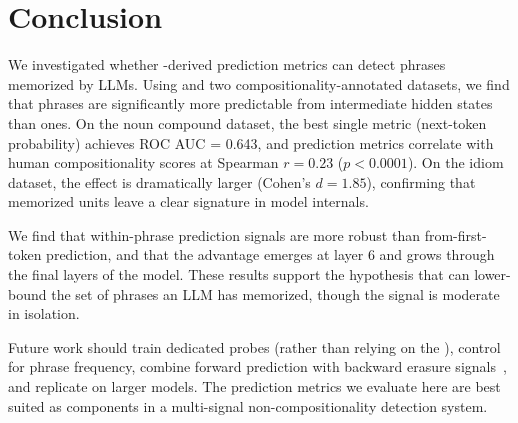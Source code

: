 \section{Conclusion}
\label{sec:conclusion}

We investigated whether \futurelens-derived prediction metrics can detect \noncomp phrases memorized by LLMs.
Using \gptxl and two compositionality-annotated datasets, we find that \noncomp phrases are significantly more predictable from intermediate hidden states than \comp ones.
On the \farahmand noun compound dataset, the best single metric (next-token probability) achieves ROC AUC = 0.643, and prediction metrics correlate with human compositionality scores at Spearman $r = 0.23$ ($p < 0.0001$).
On the \idiomem idiom dataset, the effect is dramatically larger (Cohen's $d = 1.85$), confirming that memorized \noncomp units leave a clear signature in model internals.

We find that within-phrase prediction signals are more robust than from-first-token prediction, and that the \noncomp advantage emerges at layer 6 and grows through the final layers of the model.
These results support the hypothesis that \futurelens can lower-bound the set of \noncomp phrases an LLM has memorized, though the signal is moderate in isolation.

Future work should train dedicated \futurelens probes (rather than relying on the \logitlens), control for phrase frequency, combine forward prediction with backward erasure signals~\citep{feucht2024token}, and replicate on larger models.
The prediction metrics we evaluate here are best suited as components in a multi-signal non-compositionality detection system.
